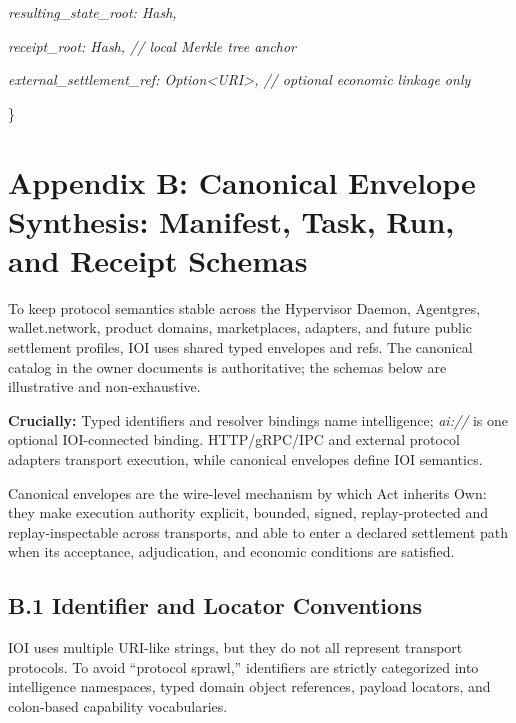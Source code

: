 \documentclass[
  11pt,
]{article}
\begin{document}
\emph{resulting\_state\_root: Hash,}

\emph{receipt\_root: Hash, // local Merkle tree anchor}

\emph{external\_settlement\_ref: Option\textless URI\textgreater, // optional economic linkage only}

\}

\hypertarget{appendix-b-canonical-envelopes-manifest-task-run-and-receipt-schemas}{%
\section{\texorpdfstring{\textbf{Appendix B: Canonical Envelope Synthesis:
Manifest, Task, Run, and Receipt
Schemas}}{Appendix B: Canonical Envelope Synthesis: Manifest, Task, Run, and Receipt Schemas}}\label{appendix-b-canonical-envelopes-manifest-task-run-and-receipt-schemas}}

To keep protocol semantics stable across the Hypervisor Daemon, Agentgres,
wallet.network, product domains, marketplaces, adapters, and future public
settlement profiles, IOI uses shared typed envelopes and refs. The canonical
catalog in the owner documents is authoritative; the schemas below are
illustrative and non-exhaustive.

\textbf{Crucially: }Typed identifiers and resolver bindings name intelligence;
\emph{ai://} is one optional IOI-connected binding. HTTP/gRPC/IPC and external
protocol adapters transport execution, while canonical envelopes define IOI
semantics.

Canonical envelopes are the wire-level mechanism by which Act inherits
Own: they make execution authority explicit, bounded, signed,
replay-protected and replay-inspectable across transports, and able to enter a
declared settlement path when its acceptance, adjudication, and economic
conditions are satisfied.

\hypertarget{b.1-identifier-and-locator-conventions}{%
\subsection{B.1 Identifier and Locator
Conventions}\label{b.1-identifier-and-locator-conventions}}

IOI uses multiple URI-like strings, but they do not all represent
transport protocols. To avoid ``protocol sprawl,'' identifiers are
strictly categorized into intelligence namespaces, typed domain object
references, payload locators, and colon-based capability vocabularies.
\end{document}
